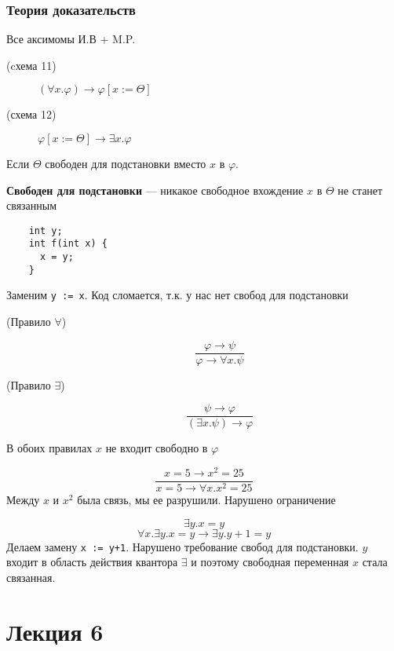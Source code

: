 \documentclass[oneside]{book}
\renewcommand{\leftmark}{}
\begin{document}
\subsection{Теория доказательств}
\label{sec:org49140c7}
Все аксимомы И.В + M.P.
\begin{description}
	\item[{(cхема 11)}] \((\forall x. \varphi) \to \varphi[x:=\Theta]\)
	\item[{(схема 12)}] \(\varphi[x:=\Theta]\to \exists x. \varphi\)
\end{description}
Если \(\Theta\) свободен для подстановки вместо \(x\) в \(\varphi\).
\begin{definition}
	\textbf{Свободен для подстановки} --- никакое свободное вхождение \(x\) в \(\Theta\) не станет связанным
\end{definition}
\begin{examp}
	\-
	\begin{verbatim}
    int y;
    int f(int x) {
      x = y;
    }
  \end{verbatim}
	Заменим \texttt{y := x}. Код сломается, т.к. у нас нет свобод для подстановки
\end{examp}
\begin{description}
	\item[{(Правило \(\forall\))}] \[\frac{\varphi \to \psi}{\varphi \to \forall x. \psi}\]
	\item[{(Правило \(\exists\))}] \[ \frac{\psi \to \varphi}{(\exists x.\psi) \to \varphi} \]
\end{description}
В обоих правилах \(x\) не входит свободно в \(\varphi\)
\begin{examp}
	\[ \frac{x = 5 \to x^2 = 25}{x = 5 \to \forall x. x^2 = 25} \]
	Между \(x\) и \(x^2\) была связь, мы ее разрушили. Нарушено ограничение
\end{examp}
\begin{examp}
	\[ \exists y. x = y \]
	\[ \forall x. \exists y. x = y \to \exists y. y + 1 = y \]
	Делаем замену \texttt{x := y+1}. Нарушено требование свобод для подстановки. \(y\) входит в область действия квантора \(\exists\) и поэтому свободная переменная \(x\) стала связанная.
\end{examp}
\chapter*{Лекция 6}\renewcommand{\leftmark}{Лекция 6}
\label{sec:org72ca0ce}
\end{document}
